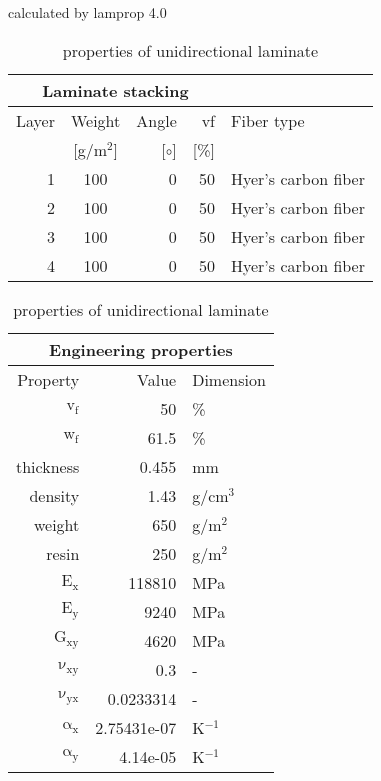 \begin{table}[!htbp]
  \renewcommand{\arraystretch}{1.2}
  \caption{\label{tab:unidirectional laminate}properties of unidirectional laminate}
  \centering\footnotesize{\rule{0pt}{10pt}
  \tiny calculated by lamprop 4.0\\[3pt]}
    \begin{tabular}[t]{rcrrl}
      \multicolumn{4}{c}{\small\textbf{Laminate stacking}}\\[0.1em]
      \toprule %
      Layer & Weight & Angle & vf & Fiber type\\
            & [g/m$^2$] & [$\circ$] & [\%]\\
      \midrule
      1 &  100 &     0 & 50 & Hyer's carbon fiber\\
      2 &  100 &     0 & 50 & Hyer's carbon fiber\\
      3 &  100 &     0 & 50 & Hyer's carbon fiber\\
      4 &  100 &     0 & 50 & Hyer's carbon fiber\\
      \bottomrule
    \end{tabular}\hspace{0.02\textwidth}
    \begin{tabular}[t]{rrl}
      \multicolumn{3}{c}{\small\textbf{Engineering properties}}\\[0.1em]
      \toprule
      Property & Value & Dimension\\
      \midrule
      $\mathrm{v_f}$ & 50 &\%\\
      $\mathrm{w_f}$ & 61.5 &\%\\
      thickness & 0.455 & mm\\
      density & 1.43 & g/cm$^3$\\
      weight & 650 & g/m$^2$\\
      resin & 250 & g/m$^2$\\
      \midrule
      $\mathrm{E_x}$ &   118810 & MPa\\
      $\mathrm{E_y}$ &     9240 & MPa\\
      $\mathrm{G_{xy}}$ &     4620 & MPa\\
      $\mathrm{\nu_{xy}}$ & 0.3 &-\\
      $\mathrm{\nu_{yx}}$ & 0.0233314 &-\\
      $\mathrm{\alpha_x}$ & 2.75431e-07 & K$^{-1}$\\
      $\mathrm{\alpha_y}$ & 4.14e-05 & K$^{-1}$\\
      \bottomrule
    \end{tabular}

\end{table}
